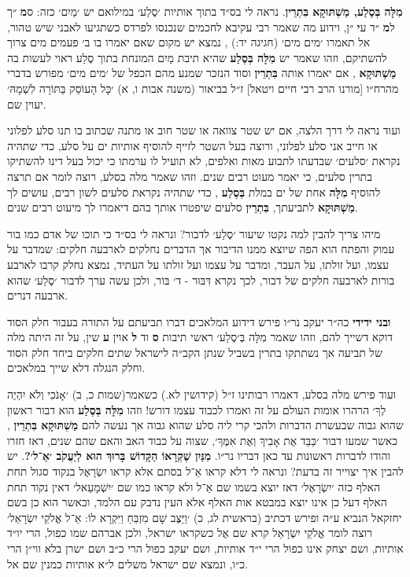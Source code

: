 \documentclass[12pt, openany]{book}
\begin{document}
{\textbf{מִלָּה בְּסֶלַע, מַשְׁתּוּקָא בִּתְרֵין}. נראה לי בס״ד בתוך אותיות ׳סֶלַע׳ במילואם יש ׳מַיִם׳ כזה: ס\textbf{מ} ״ך ל\textbf{מ} ״ד ע\textbf{י} ״ן, וידוע מה שאמר רבי עקיבא לחכמים שנכנסו לפרדס כשתגיעו לאבני שיש טהור, אל תאמרו ׳מים מים׳ {\small (חגיגה יד:)} , נמצא יש מקום שאם יאמרו בו ב׳ פעמים מים צרוך להשתיקם, וזהו שאמר יש \textbf{מִלָּה בְּסֶלַע} שהיא תיבת מַיִם המונחת בתוך סֶלַע ראוי לעשות בה \textbf{מַשְׁתּוּקָא} , אם יאמרו אותה \textbf{בִּתְרֵין} וסוד הנזכר שמנע מהם הכפל של ׳מים מים׳ מפורש בדברי מהרח״ו {\small [מורנו הרב רבי חיים ויטאל]} ז״ל בביאור {\small (משנה אבות ו, א)} ׳כָּל הָעוֹסֵק בַּתּוֹרָה לִשְׁמָהּ׳ יעוין שם.\par ועוד נראה לי דרך הלצה, אם יש שטר צוואה או שטר חוב או מתנה שכתוב בו תנו סלע לפלוני או חייב אני סלע לפלוני, ורוצה בעל השטר לזייף להוסיף אותיות ים על סלע, כדי שתהיה נקראת ׳סלעים׳ שבדעתו לתבוע מאות ואלפים, לא תועיל לו ערמתו כי יכול בעל דינו להשתיקו בתרין סלעים, כי יאמר מעוט רבים שנים. וזהו שאמר מלה בסלע, רוצה לומר אם תרצה להוסיף \textbf{מִלָּה} אחת של ים במלת \textbf{בְּסֶלַע} , כדי שתהיה נקראת סלעים לשון רבים, עושים לך \textbf{מַשְׁתּוּקָא} לתביעתך, \textbf{בִּתְרֵין} סלעים שיפטרו אותך בהם דיאמרו לך מיעוט רבים שנים.\par מיהו צריך להבין למה נקטו שיעור ׳סֶלַע׳ לדבור? ונראה לי בס״ד כי תוכו של אדם כמו בור עמוק והפתח הוא הפה שיוצא ממנו הדיבור אך הדברים נחלקים לארבעה חלקים: שמדבר על עצמו, ועל זולתו, על העבר, ומדבר על עצמו ועל זולתו על העתיד, נמצא נחלק קרבו לארבע בורות לארבעה חלקים של דבור, לכך נקרא דִּבּוּר - ד׳ בּוֹר, ולכן עשה ערך לדבור ׳סֶלַע׳ שהוא ארבעה דנרים.\par \textbf{ובני ידידי} כה״ר יעקב נר״ו פירש דידוע המלאכים דברו תביעתם על התורה בעבור חלק הסוד דוקא דשייך להם, וזהו שאמר מִלָּה בְּ׳סֶלַע׳ ראשי תיבות \textbf{ס} וד \textbf{ל} אוין \textbf{ע} שין, על זה היתה מלה של תביעה אך נשתתקו בתרין בשביל שנתן הקב״ה לישראל שתים חלקים ביחד חלק הסוד וחלק הנגלה דלא שייך במלאכים.\par ועוד פירש מלה בסלע, דאמרו רבותינו ז״ל {\small (קידושין לא.)} כשאמר{\small (שמות כ, ב)} ׳אָנֹכִי וְלֹא יִהְיֶה לְךָ׳ הרהרו אומות העולם על זה ואמרו לכבוד עצמו דורש! וזהו \textbf{מִלָּה בְּסֶלַע} הוא דבור ראשון שהוא גבוה שבעשרת הדברות ולהכי קרי ליה סלע שהוא גבוה אך נעשה להם \textbf{מַשְׁתּוּקָא בִּתְרֵין} , כאשר שמעו דבור ׳כַּבֵּד אֶת אָבִיךָ וְאֶת אִמֶּךָ׳, שצוה על כבוד האב והאם שהם שנים, דאז חזרו והודו לדברות ראשונות עד כאן דבריו נר״ו.
\textbf{מִנַּיִן שֶׁקְּרָאוֹ הַקָּדוֹשׁ בָּרוּךְ הוּא לְיַעֲקֹב ׳אֵ־ל׳?}. יש להבין איך יצוייר זה בדעת? ונראה לי דלא קראו אֵ־ל בסתם אלא קראו יִשְׂרָאֶל בנקוד סגול תחת האלף כזה ׳יִשְׂרָאֶל׳ דאז יוצא בשמו שם אֵ־ל ולא קראו כמו שם ׳יִשְׁמָעֵאל׳ דאין נקוד תחת האלף דעל כן אינו יוצא במבטא אות האלף אלא העין נדבק עם הלמד, וכאשר הוא כן בשם יחזקאל הנביא ע״ה ופירש דכתיב {\small (בראשית לג, כ)} ׳וַיַּצֶּב שָׁם מִזְבֵּחַ וַיִּקְרָא לוֹ: אֵ־ל אֱלֹקֵי יִשְׂרָאֵל׳ רוצה לומר אֱלֹקֵי יִשְׂרָאֵל קרא שם אֶל כשקראו ישראל, ולכן אברהם שמו כפול, הרי יו״ד אותיות, ושם יצחק אינו כפול הרי י״ד אותיות, ושם יעקב כפול הרי כ״ב ושם ישרן בלא ווי״ן הרי כ״ו, ונמצא שם ישראל משלים ל״א אותיות כמנין שם אל.
\clearpage}
\end{document}
